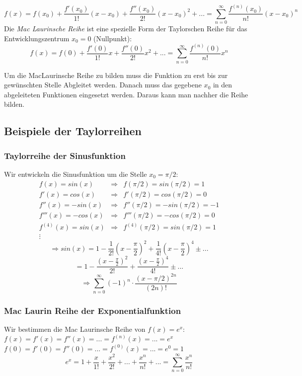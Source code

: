 \begin{formel}
$$f(x) = f(x_0) + \frac{f'(x_0)}{1!}(x-x_0) + \frac{f''(x_0)}{2!}(x-x_0)^2 + ... = \sum\limits_{n=0}^{\infty} \frac{f^{(n)}(x_0)}{n!}(x - x_0)^n$$
Die \textit{Mac Laurinsche Reihe} ist eine spezielle Form der Taylorschen Reihe für das Entwicklungszentrum $x_0 = 0$ (Nullpunkt):
$$f(x) = f(0) + \frac{f'(0)}{1!}x + \frac{f''(0)}{2!}x^2 + ... = \sum\limits_{n=0}^{\infty} \frac{f^{(n)}(0)}{n!}x^n$$
\end{formel}
Um die MacLaurinsche Reihe zu bilden muss die Funktion zu erst bis zur gewünschten Stelle Abgleitet werden. Danach muss das gegebene $x_0$ in den abgeleiteten Funktionen eingesetzt werden. Daraus kann man nachher die Reihe bilden.

\subsection{Beispiele der Taylorreihen}
\subsubsection*{Taylorreihe der Sinusfunktion}
Wir entwickeln die Sinusfunktion um die Stelle $x_0 = \pi / 2$:
\begin{align*}
	f(x) = sin(x) 			&\Rightarrow & f(\pi / 2) 		= sin(\pi / 2) = 1 	\\
	f'(x) = cos(x)			&\Rightarrow & f'(\pi / 2) 		= cos(\pi / 2) = 0 	\\
	f''(x) = -sin(x)		&\Rightarrow & f''(\pi / 2) 			= -sin(\pi / 2) = -1	\\
	f'''(x) = -cos(x)		&\Rightarrow & f'''(\pi / 2) 		= -cos(\pi / 2) = 0	\\
	f^{(4)}(x) = sin(x)	&\Rightarrow & f^{(4)}(\pi / 2) 	= sin(\pi / 2) = 1		\\
	\vdots
\end{align*}
$$\Rightarrow  sin(x) = 1 - \frac{1}{2!}\left(x-\frac{\pi}{2}\right)^2 + \frac{1}{4!}\left(x-\frac{\pi}{2}\right)^4 \pm ...$$
$$ = 1 - \frac{\left(x-\frac{\pi}{2}\right)^2}{2!} + \frac{\left(x-\frac{\pi}{2}\right)^4}{4!} \pm ...$$
$$\Rightarrow  \sum\limits_{n=0}^{\infty} (-1)^n \cdot \frac{(x-\pi / 2)^{2n}}{(2n)!}$$

\subsubsection*{Mac Laurin Reihe der Exponentialfunktion}
Wir bestimmen die Mac Laurinsche Reihe von $f(x) = e^x$:\\
$f(x) = f'(x) = f''(x) = ... = f^{(n)}(x) = ... = e^x$\\
$f(0) = f'(0) = f''(0) = ... = f^{(0)}(x) = ... = e^0 = 1$
$$e^x = 1 + \frac{x}{1!} + \frac{x^2}{2!} + ... + \frac{x^n}{n!} + ... = \sum\limits_{n=0}^{\infty} \frac{x^n}{n!}$$

